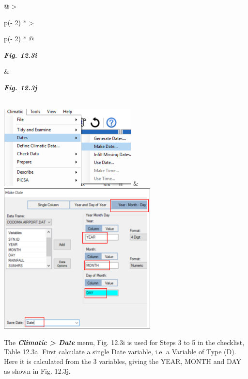 \documentclass[
  letterpaper,
  DIV=11,
  numbers=noendperiod]{scrreprt}
\begin{document}
\begin{longtable}[]{@{}
  >{\raggedright\arraybackslash}p{(\columnwidth - 2\tabcolsep) * }
  >{\raggedright\arraybackslash}p{(\columnwidth - 2\tabcolsep) * }@{}}
\toprule\noalign{}
\begin{minipage}[b]{\linewidth}\raggedright
\textbf{\emph{Fig. 12.3i}}
\end{minipage} & \begin{minipage}[b]{\linewidth}\raggedright
\textbf{\emph{Fig. 12.3j}}
\end{minipage} \\
\midrule\noalign{}
\endhead
\bottomrule\noalign{}
\endlastfoot
\includegraphics[width=2.73242in,height=1.65301in]{figures/Fig12.3i.png}
&
\includegraphics[width=3.14155in,height=3.01915in]{figures/Fig12.3j.png} \\
\end{longtable}

The \textbf{\emph{Climatic \textgreater{} Date}} menu, Fig. 12.3i is
used for Steps 3 to 5 in the checklist, Table 12.3a. First calculate a
single Date variable, i.e. a Variable of Type (D). Here it is calculated
from the 3 variables, giving the YEAR, MONTH and DAY as shown in Fig.
12.3j.
\end{document}
